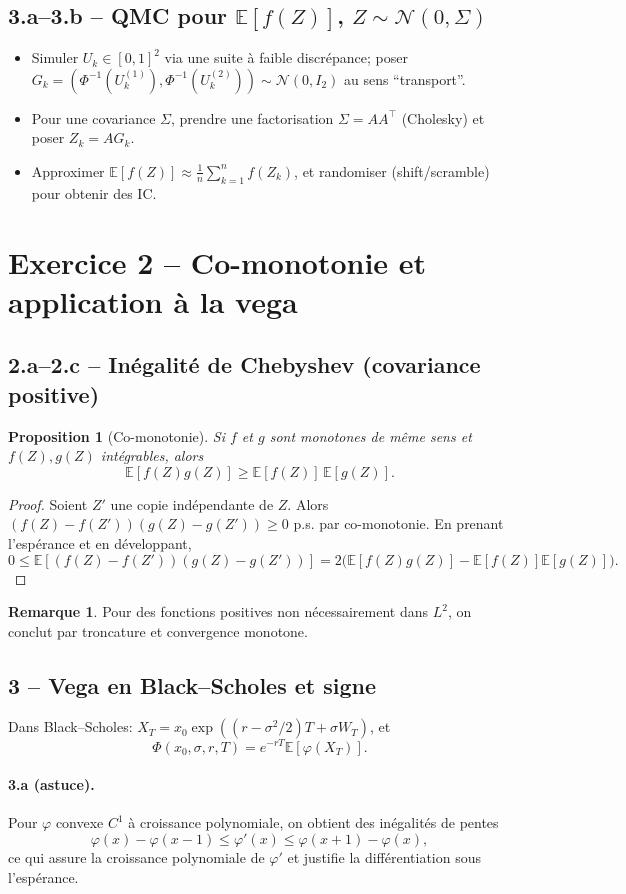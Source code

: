 \documentclass[11pt,a4paper]{article}
\newcommand{\E}{\mathbb{E}}
\newcommand{\1}{\mathbbm{1}}
\theoremstyle{plain}
\newtheorem{proposition}{Proposition}
\theoremstyle{definition}
\newtheorem{remark}{Remarque}
\begin{document}
\subsection{3.a--3.b -- QMC pour $\E[f(Z)]$, $Z\sim\mathcal N(0,\Sigma)$}
\begin{itemize}[leftmargin=*]
  \item Simuler $U_k\in[0,1]^2$ via une suite à faible discrépance; poser $G_k=(\Phi^{-1}(U_k^{(1)}),\Phi^{-1}(U_k^{(2)}))\sim \mathcal N(0,I_2)$ au sens ``transport''.
  \item Pour une covariance $\Sigma$, prendre une factorisation $\Sigma=AA^\top$ (Cholesky) et poser $Z_k=AG_k$.
  \item Approximer $\E[f(Z)]\approx \frac1n\sum_{k=1}^n f(Z_k)$, et randomiser (shift/scramble) pour obtenir des IC.
\end{itemize}

\section{Exercice 2 -- Co-monotonie et application à la vega}
\subsection{2.a--2.c -- Inégalité de Chebyshev (covariance positive)}
\begin{proposition}[Co-monotonie]\label{prop:comono}
Si $f$ et $g$ sont monotones de même sens et $f(Z),g(Z)$ intégrables, alors
\[
\E[f(Z)g(Z)]\ge \E[f(Z)]\,\E[g(Z)].
\]
\end{proposition}
\begin{proof}
Soient $Z'$ une copie indépendante de $Z$. Alors $(f(Z)-f(Z'))(g(Z)-g(Z'))\ge 0$ p.s. par co-monotonie.
En prenant l'espérance et en développant,
\[
0\le \E[(f(Z)-f(Z'))(g(Z)-g(Z'))]=2\Big(\E[f(Z)g(Z)]-\E[f(Z)]\E[g(Z)]\Big).
\]
\end{proof}
\begin{remark}
Pour des fonctions positives non nécessairement dans $L^2$, on conclut par troncature et convergence monotone.
\end{remark}

\subsection{3 -- Vega en Black--Scholes et signe}
Dans Black--Scholes: $X_T=x_0\exp((r-\sigma^2/2)T+\sigma W_T)$, et
\[
\Phi(x_0,\sigma,r,T)=e^{-rT}\E[\varphi(X_T)].
\]
\paragraph{3.a (astuce).}
Pour $\varphi$ convexe $C^1$ à croissance polynomiale, on obtient des inégalités de pentes
\[
\varphi(x)-\varphi(x-1)\le \varphi'(x)\le \varphi(x+1)-\varphi(x),
\]
ce qui assure la croissance polynomiale de $\varphi'$ et justifie la différentiation sous l'espérance.
\end{document}

